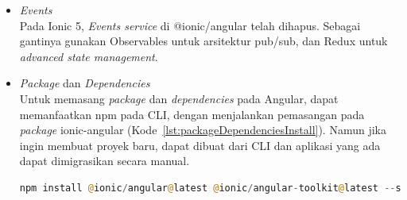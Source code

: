 \begin{enumerate}
\begin{itemize}
		\item {\it Events} \\
		Pada Ionic 5, {\it Events service} di @ionic/angular telah dihapus. Sebagai gantinya gunakan Observables untuk arsitektur pub/sub, dan Redux untuk {\it advanced state management}.
		
		\item {\it Package} dan {\it Dependencies} \\
		Untuk memasang {\it package} dan {\it dependencies} pada Angular, dapat memanfaatkan npm pada CLI, dengan menjalankan pemasangan pada {\it package} ionic-angular  (Kode~\ref{lst:packageDependenciesInstall}). Namun jika ingin membuat proyek baru, dapat dibuat dari CLI dan aplikasi yang ada dapat dimigrasikan secara manual.
		\begin{lstlisting}[language=php, label={lst:packageDependenciesInstall}, caption=Kode untuk Memasang {\it Package} dan {\it Dependencies} pada Angular]
			npm install @ionic/angular@latest @ionic/angular-toolkit@latest --save
		\end{lstlisting} 
	\end{itemize}


\end{enumerate}




%



